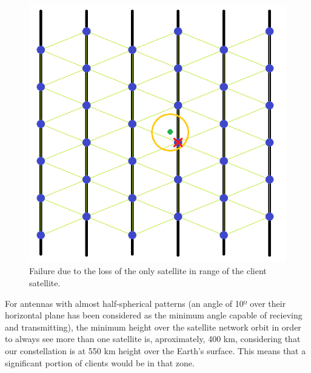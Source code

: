 \begin{figure}[H]
\begin{center}
\includegraphics[scale=0.5]{./sections/Constellation_Deployment/S5-Spare_Strategy/critical1.png}
\caption[1 communication range failure]{Failure due to the loss of the only satellite in range of the client satellite.}
\label{fig:critical1}
\end{center}
\end{figure}

For antennas with almost half-spherical patterns (an angle of 10º over their horizontal plane has been considered as the minimum angle capable of recieving and transmitting), the minimum height over the satellite network orbit in order to always see more than one satellite is, aproximately, 400 km, considering that our constellation is at 550 km height over the Earth's surface. This means that a significant portion of clients would be in that zone.


